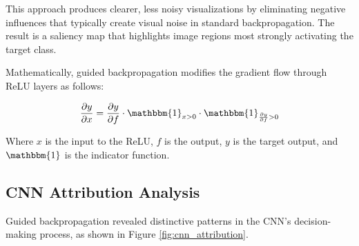 \documentclass[10pt,twocolumn]{article}
\begin{document}
This approach produces clearer, less noisy visualizations by eliminating negative influences that typically create visual noise in standard backpropagation. The result is a saliency map that highlights image regions most strongly activating the target class.

Mathematically, guided backpropagation modifies the gradient flow through ReLU layers as follows:

\begin{equation}
\frac{\partial y}{\partial x} = \frac{\partial y}{\partial f} \cdot \mathbbm{1}_{x > 0} \cdot \mathbbm{1}_{\frac{\partial y}{\partial f} > 0}
\end{equation}

Where $x$ is the input to the ReLU, $f$ is the output, $y$ is the target output, and $\mathbbm{1}$ is the indicator function.

\subsection{CNN Attribution Analysis}
Guided backpropagation revealed distinctive patterns in the CNN's decision-making process, as shown in Figure \ref{fig:cnn_attribution}.
\end{document}

